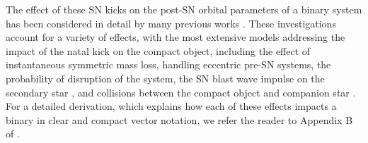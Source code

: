 \documentclass[apj,twocolumn]{openjournal}
\begin{document}
The effect of these SN kicks on the post-SN orbital parameters of a binary system has been considered in detail by many previous works \citep[e.g.,][]{Flannery+1975:1975A&A....39...61F,Sutantyo+1978:1978Ap&SS..54..479S,Hills+1983:1983ApJ...267..322H,Dewey+1987:1987ApJ...321..780D,Wijers+1992:1992A&A...261..145W,Brandt+1995:1995MNRAS.274..461B,Kalogera+1996:1996ApJ...471..352K,Tauris+1998:1998AA...330.1047T,Hurley+2002,pfahl_comprehensive_2002,Belczynski+2008:2008ApJS..174..223B,Kiel+2009:2009MNRAS.395.2326K, Pijloo+2012:2012MNRAS.424.2914P}. These investigations account for a variety of effects, with the most extensive models addressing the impact of the natal kick on the compact object, including the effect of instantaneous symmetric mass loss, handling eccentric pre-SN systems, the probability of disruption of the system, the SN blast wave impulse on the secondary star \citep[e.g.,][]{Liu+2015:2015A&A...584A..11L, Hirai+2018:2018ApJ...864..119H, Ogata+2021:2021MNRAS.505.2485O,Wong+2024:2024ApJ...973...65W}, and collisions between the compact object and companion star \citep[e.g.,][]{Davies+1992:1992ApJ...401..246D,Hirai+2022:2022MNRAS.517.4544H, Kremer+2022:2022ApJ...933..203K}. For a detailed derivation, which explains how each of these effects impacts a binary in clear and compact vector notation, we refer the reader to Appendix B of \citet{pfahl_comprehensive_2002}. 
\end{document}
